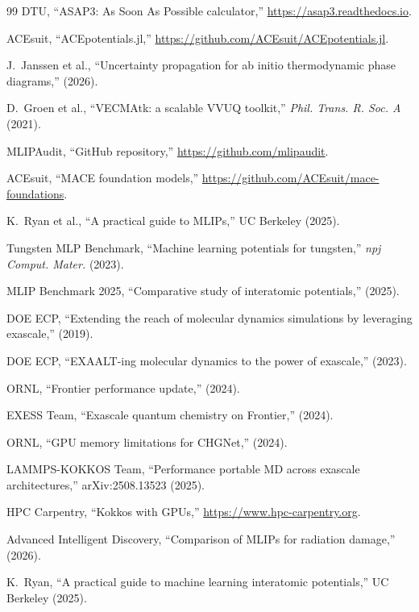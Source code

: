 \documentclass[11pt,a4paper]{article}
\begin{document}
\begin{thebibliography}{99}
DTU, ``ASAP3: As Soon As Possible calculator,'' \url{https://asap3.readthedocs.io}.

ACEsuit, ``ACEpotentials.jl,'' \url{https://github.com/ACEsuit/ACEpotentials.jl}.

J.~Janssen et al., ``Uncertainty propagation for ab initio thermodynamic phase diagrams,'' (2026).

D.~Groen et al., ``VECMAtk: a scalable VVUQ toolkit,'' \textit{Phil. Trans. R. Soc. A} (2021).

MLIPAudit, ``GitHub repository,'' \url{https://github.com/mlipaudit}.

ACEsuit, ``MACE foundation models,'' \url{https://github.com/ACEsuit/mace-foundations}.

K.~Ryan et al., ``A practical guide to MLIPs,'' UC Berkeley (2025).

Tungsten MLP Benchmark, ``Machine learning potentials for tungsten,'' \textit{npj Comput. Mater.} (2023).

MLIP Benchmark 2025, ``Comparative study of interatomic potentials,'' (2025).

DOE ECP, ``Extending the reach of molecular dynamics simulations by leveraging exascale,'' (2019).

DOE ECP, ``EXAALT-ing molecular dynamics to the power of exascale,'' (2023).

ORNL, ``Frontier performance update,'' (2024).

EXESS Team, ``Exascale quantum chemistry on Frontier,'' (2024).

ORNL, ``GPU memory limitations for CHGNet,'' (2024).

LAMMPS-KOKKOS Team, ``Performance portable MD across exascale architectures,'' arXiv:2508.13523 (2025).

HPC Carpentry, ``Kokkos with GPUs,'' \url{https://www.hpc-carpentry.org}.

Advanced Intelligent Discovery, ``Comparison of MLIPs for radiation damage,'' (2026).

K.~Ryan, ``A practical guide to machine learning interatomic potentials,'' UC Berkeley (2025).


\end{thebibliography}
\end{document}
